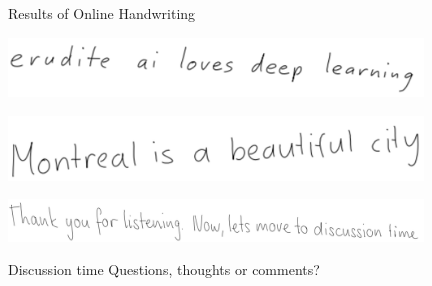 \documentclass[envcountsect]{beamer}
\begin{document}
\begin{frame}{Results of Online Handwriting}
\begin{center}
\includegraphics[width=11cm]{./imag/dl.png}
\end{center}
\pause
\begin{center}
\includegraphics[width=11cm]{./imag/montreal.png}
\end{center}
\pause
\begin{center}
\includegraphics[width=11cm]{./imag/listening.png}
\end{center}
\end{frame}

\begin{frame}{Discussion time}
    Questions, thoughts or comments?
\end{frame}
\end{document}
